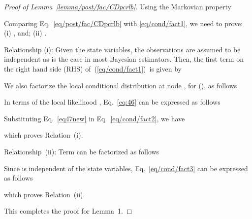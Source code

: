 \documentclass[10pt,twocolumn,twoside]{IEEEtran}
\begin{document}
\begin{proof}[Proof of Lemma~\ref{lemma/post/fac/CDpcrlb}]
Using the Markovian property

Comparing Eq.~\eqref{eq/post/fac/CDpcrlb} with \eqref{eq/cond/fact1}, we need to prove: (i) , and; (ii) .

Relationship (i):
Given the state variables, the observations are assumed to be independent as is the case in most Bayesian estimators.
Then,  the first term on the right hand side (RHS) of~(\ref{eq/cond/fact1})~is  given by

We also factorize the local conditional distribution at node , for (), as follows

In terms of the local likelihood , Eq.~\eqref{eq:46} can be expressed as follows

Substituting Eq.~\eqref{eq47new} in Eq.~\eqref{eq/cond/fact2}, we have

which proves Relation~(i).

\noindent
Relationship~(ii): Term  can be factorized as follows

Since  is independent of the state
variables, Eq.~\eqref{eq/cond/fact3} can be expressed as follows

which proves Relation~(ii).

\noindent
This completes the proof for Lemma~1.
\end{proof}
\end{document}
